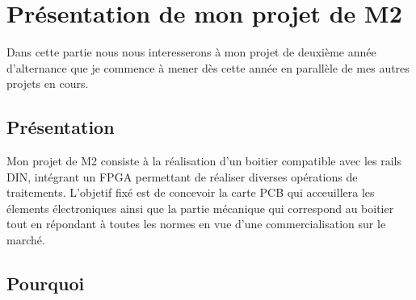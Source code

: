 \section{Présentation de mon projet de M2 }

Dans cette partie nous nous interesserons à mon projet de deuxième année d'alternance que je commence à mener dès cette année en parallèle de mes autres projets en cours. 

\subsection{Présentation}

Mon projet de M2 consiste à la réalisation d'un boitier compatible avec les rails DIN, intégrant un FPGA permettant de réaliser diverses opérations de traitements. L'objetif fixé est de concevoir la carte PCB qui acceuillera les élements électroniques ainsi que la partie mécanique qui correspond au boitier tout en répondant à toutes les normes en vue d'une commercialisation sur le marché. 

\subsection{Pourquoi }